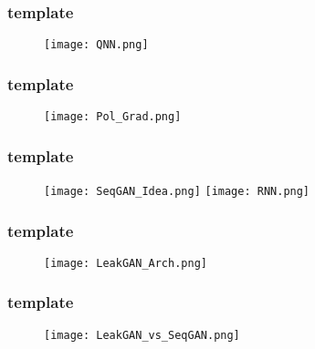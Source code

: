\documentclass{beamer}
\begin{document}
\begin{frame}
\frametitle{template}
\begin{figure}[ht]
  \texttt{[image: QNN.png]}
\end{figure}
\end{frame}

\begin{frame}
\frametitle{template}
\begin{figure}[ht]
  \texttt{[image: Pol\_Grad.png]}
\end{figure}
\end{frame}


\begin{frame}
\frametitle{template}
\begin{figure}[ht]
  \texttt{[image: SeqGAN\_Idea.png]}
  \texttt{[image: RNN.png]}
\end{figure}
\end{frame}


\begin{frame}
\frametitle{template}
\begin{figure}[ht]
  \texttt{[image: LeakGAN\_Arch.png]}
\end{figure}
\end{frame}

\begin{frame}
\frametitle{template}
\begin{figure}[ht]
  \texttt{[image: LeakGAN\_vs\_SeqGAN.png]}
\end{figure}
\end{frame}

% 
% 
% 
% 
% 
% 
% 
\end{document}

